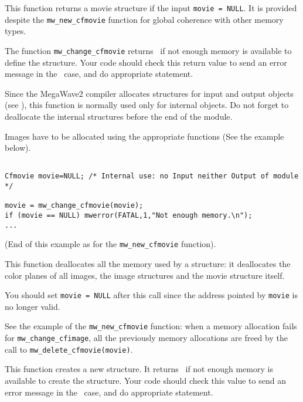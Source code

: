 \Description
This function returns a movie structure if the input \verb+movie = NULL+.
It is provided despite the \verb+mw_new_cfmovie+ function for
global coherence with other memory types.

The function \verb+mw_change_cfmovie+ returns \Null\ if not enough memory is available to define the structure. Your code should check this return value to 
send an error message in the \Null\ case, and do appropriate statement.

Since the MegaWave2 compiler allocates structures for input and output 
objects (see \volI), this function is normally used only for internal objects.
Do not forget to deallocate the internal structures before the end
of the module.

Images have to be allocated using the appropriate functions (See the example
below).

\Next
\Example
\begin{verbatim}

Cfmovie movie=NULL; /* Internal use: no Input neither Output of module */

movie = mw_change_cfmovie(movie);
if (movie == NULL) mwerror(FATAL,1,"Not enough memory.\n");
...
\end{verbatim}
(End of this example as for the \verb+mw_new_cfmovie+ function).
\newpage %


\Description
This function deallocates all the memory used by a \cfmovie structure:
it deallocates the color planes of all images, the image structures and
the movie structure itself.

You should set \verb+movie = NULL+ after this call since the address pointed
by \verb+movie+ is no longer valid.

\Next
\Example
See the example of the \verb+mw_new_cfmovie+ function: when a memory allocation
fails for \verb+mw_change_cfimage+, all the previously memory allocations are
freed by the call to \verb+mw_delete_cfmovie(movie)+.

\newpage %


\Description
This function creates a new \cfmovie structure.
It returns \Null\ if not enough memory is available to create the structure.
Your code should check this value to send an
error message in the \Null\ case, and do appropriate statement.

